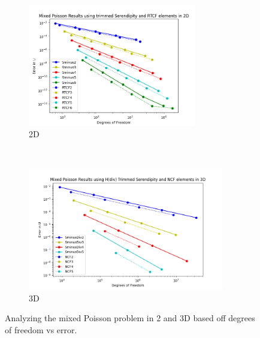 \documentclass[manuscript,screen]{acmart}
\begin{document}
\begin{figure}[h!]
  \centering
  \begin{subfigure}[h]{0.45\textwidth}
    \centering
    \includegraphics[height=2.1in]{MixedPoisson-2d-SminusDiv_RTCF.png}
    \caption{2D}
    \label{fig:2dMixedDofs}
  \end{subfigure}
  ~
  \begin{subfigure}[h]{0.45\textwidth}
    \centering
    \includegraphics[height=2.1in]{MixedPoisson3d_TrimmedSerendipityNCF.png}
    \caption{3D}
    \label{fig:3dMixedDofs}
  \end{subfigure}
  \caption{Analyzing the mixed Poisson problem in 2 and 3D based off degrees of freedom vs error.}
\end{figure} 

\newpage


\end{document}
